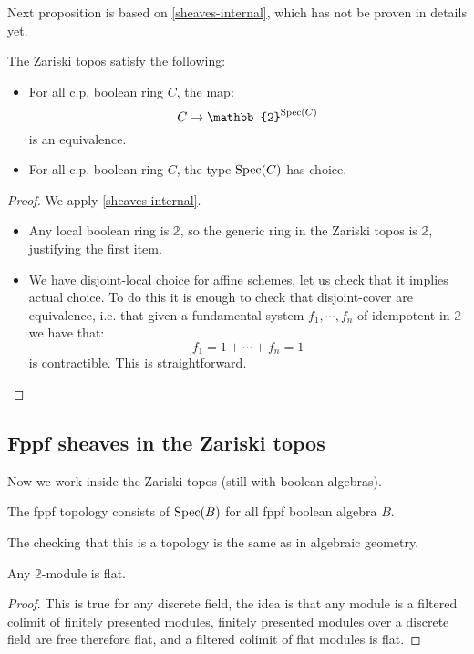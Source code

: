 Next proposition is based on \cref{sheaves-internal}, which has not be proven in details yet.

\begin{proposition}
The Zariski topos satisfy the following:
\begin{itemize}
\item For all c.p. boolean ring $C$, the map:
\[C\to \mathbb{2}^{\Spec(C)}\]
is an equivalence.
\item For all c.p. boolean ring $C$, the type $\operatorname{Spec}(C)$ has choice.
\end{itemize}
\end{proposition}

\begin{proof}
We apply \cref{sheaves-internal}. 
\begin{itemize}
\item Any local boolean ring is $\mathbb{2}$, so the generic ring in the Zariski topos is $\mathbb{2}$, justifying the first item.
\item We have disjoint-local choice for affine schemes, let us check that it implies actual choice. To do this it is enough to check that disjoint-cover are equivalence, i.e. that given a fundamental system $f_1,\cdots,f_n$ of idempotent in $\mathbb{2}$ we have that:
\[f_1=1 + \cdots + f_n=1\]
is contractible. This is straightforward.
\end{itemize}
\end{proof}


\subsection{Fppf sheaves in the Zariski topos}

Now we work inside the Zariski topos (still with boolean algebras).

\begin{definition}
The fppf topology consists of $\operatorname{Spec}(B)$ for all fppf boolean algebra $B$.
\end{definition}

The checking that this is a topology is the same as in algebraic geometry.

\begin{lemma}\label{2-modules-flat}
Any $\mathbb{2}$-module is flat.
\end{lemma}

\begin{proof}
This is true for any discrete field, the idea is that any module is a filtered colimit of finitely presented modules, finitely presented modules over a discrete field are free therefore flat, and a filtered colimit of flat modules is flat.
\end{proof}

